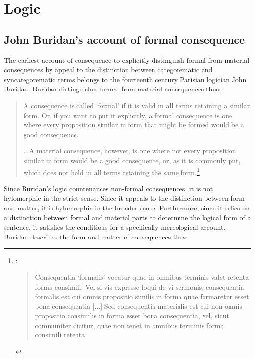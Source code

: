 \documentclass[]{article}
\begin{document}
\section{Logic}
\subsection{John Buridan's account of formal consequence}
The earliest account of consequence to explicitly distinguish formal from material consequences by appeal to the distinction between categorematic and syncategorematic terms belongs to the fourteenth century Parisian logician John Buridan. Buridan distinguishes formal from material consequences thus:

\begin{quote}
	A consequence is called `formal' if it is valid in all terms retaining a similar form. Or, if you want to put it explicitly, a formal consequence is one where every proposition similar in form that might be formed would be a good consequence.
	
	...A material consequence, however, is one where not every proposition similar in form would be a good consequence, or, as it is commonly put, which does not hold in all terms retaining the same form.\footnote{\autocite[I. 4, p. 68]{Buridan2015}: 
		\begin{quote}
Consequentia `formalis' vocatur quae in omnibus terminis valet retenta forma consimili. Vel si vis expresse loqui de vi sermonis, consequentia formalis est cui omnis propositio similis in forma quae formaretur esset bona consequentia [...] Sed consequentia materialis est cui non omnis propositio consimilis in forma esset bona consequentia, vel, sicut communiter dicitur, quae non tenet in omnibus terminis forma consimili retenta.
		\end{quote}}
\end{quote}

Since Buridan's logic countenances non-formal consequences, it is not hylomorphic in the strict sense. Since it appeals to the distinction between form and matter, it is hylomorphic in the broader sense. Furthermore, since it relies on a distinction between formal and material parts to determine the logical form of a sentence, it satisfies the conditions for a specifically mereological account. Buridan describes the form and matter of consequences thus:
\end{document}
